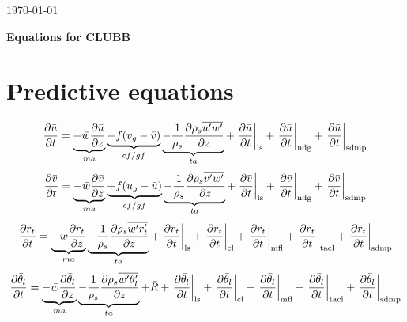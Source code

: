 \documentclass[11pt,fleqn]{article}
\newcommand{\ptlder}[2]{\frac{\partial #1}{\partial #2}}
\newcommand{\inverse}[1]{\frac{1}{#1}}
\begin{document}
\begin{flushright} \today \end{flushright}

\vspace*{.1in}
\begin{center}  {\Large\bf Equations for CLUBB}  \end{center}
\vspace*{.1in}

\section{Predictive equations}

\begin{equation}
\label{eq_um}
\ptlder{\bar{u}}{t} 
= \underbrace{ - \bar{w}\ptlder{\bar{u}}{z} }_{ma}
  \underbrace{ - f (v_g - \bar{v}) }_{cf/gf}
  \underbrace{ - \inverse{\rho_{s}}\ptlder{\rho_{s}\overline{u'w'}}{z} }_{ta} 
  + \left. \ptlder{\bar{u}}{t} \right|_{\rm{ls}}
  + \left. \ptlder{\bar{u}}{t} \right|_{\rm{ndg}}
  + \left. \ptlder{\bar{u}}{t} \right|_{\rm{sdmp}}
\end{equation}
%
\begin{equation}
\label{eq_vm}
\ptlder{\bar{v}}{t} 
= \underbrace{ - \bar{w}\ptlder{\bar{v}}{z} }_{ma}
  \underbrace{ + f (u_g - \bar{u}) }_{cf/gf}
  \underbrace{ - \inverse{\rho_{s}}\ptlder{\rho_{s}\overline{v'w'}}{z} }_{ta}
  + \left. \ptlder{\bar{v}}{t} \right|_{\rm{ls}}
  + \left. \ptlder{\bar{v}}{t} \right|_{\rm{ndg}}
  + \left. \ptlder{\bar{v}}{t} \right|_{\rm{sdmp}}
\end{equation}
%
\begin{equation}
\label{eq_rtm}
\ptlder{\bar{r}_t}{t}
= \underbrace{ - \bar{w}\ptlder{\bar{r}_t}{z} }_{ma}
  \underbrace{ - \inverse{\rho_{s}}\ptlder{\rho_{s}\overline{w'r'_t}}{z} }_{ta}
  + \left. \ptlder{\bar{r}_t}{t} \right|_{\rm{ls}}
  + \left. \ptlder{\bar{r}_t}{t} \right|_{\rm{cl}}
  + \left. \ptlder{\bar{r}_t}{t} \right|_{\rm{mfl}}
  + \left. \ptlder{\bar{r}_t}{t} \right|_{\rm{tacl}}
  + \left. \ptlder{\bar{r}_t}{t} \right|_{\rm{sdmp}}
\end{equation}
%
\begin{equation}
\label{eq_thlm}
\ptlder{\bar{\theta}_l}{t} 
= \underbrace{ - \bar{w}\ptlder{\bar{\theta}_l}{z} }_{ma}
  \underbrace{ - \inverse{\rho_{s}}\ptlder{\rho_{s}\overline{w'\theta'_l}}{z} }_{ta} 
  + \bar{R}   
  + \left. \ptlder{\bar{\theta}_l}{t} \right|_{\rm{ls}}
  + \left. \ptlder{\bar{\theta}_l}{t} \right|_{\rm{cl}}
  + \left. \ptlder{\bar{\theta}_l}{t} \right|_{\rm{mfl}}
  + \left. \ptlder{\bar{\theta}_l}{t} \right|_{\rm{tacl}}
  + \left. \ptlder{\bar{\theta}_l}{t} \right|_{\rm{sdmp}}
\end{equation}
\end{document}
